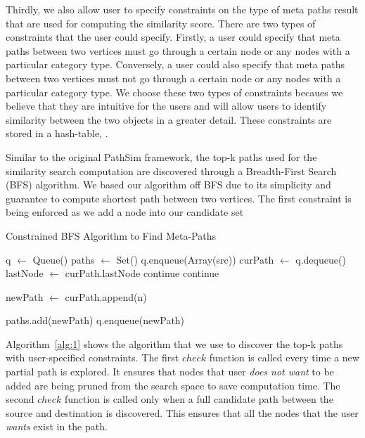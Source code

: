 Thirdly, we also allow user to specify constraints on the type of meta paths
result that are used for computing the similarity score. There are two types of
constraints that the user could specify. Firstly, a user could specify that
meta paths between two vertices must go through a certain node or any nodes
with a particular category type. Conversely,  a user could also specify that
meta paths between two vertices must not go through a certain node or any nodes
with a particular category type. We choose these two types of constraints
becaues we believe that they are intuitive for the users and will allow users
to identify similarity between the two objects in a greater detail. These
constraints are stored in a hash-table, \cTable.

Similar to the original PathSim framework, the top-k paths used for the
similarity search computation are discovered through a Breadth-First Search
(BFS) algorithm. We based our algorithm off BFS due to its simplicity and guarantee to
compute shortest path between two vertices. The first constraint is being
enforced as we add a node into our candidate set

\begin{algorithm}
    \caption{Constrained BFS Algorithm to Find Meta-Paths}
    \label{alg:1}
    \begin{algorithmic}[1]
            \State q $\gets$ Queue()
            \State paths $\gets$ Set()
            \State q.enqueue(Array(src))
            \State
                \State curPath $\gets$ q.dequeue()
                \State lastNode $\gets$ curPath.lastNode
                        \State continue
                        \State continue
                    \EndIf
                    \State

                    \State newPath $\gets$ curPath.append(n)

                            \State paths.add(newPath)
                        \EndIf
                    \Else
                        \State q.enqueue(newPath)
                    \EndIf
                \EndFor
            \EndWhile
            \State
            \State {}
        \EndFunction
    \end{algorithmic}
\end{algorithm}

Algorithm~\ref{alg:1} shows the algorithm that we use to discover the top-k
paths with user-specified constraints. The first $check$ function
is called every time a new partial path is explored. It ensures that nodes
that user \textit{does not want} to be added are being pruned from the search
space to save computation time. The second $check$ function
is called only when a full candidate path between the source and destination
is discovered. This ensures that all the nodes that the user \textit{wants}
exist in the path.
